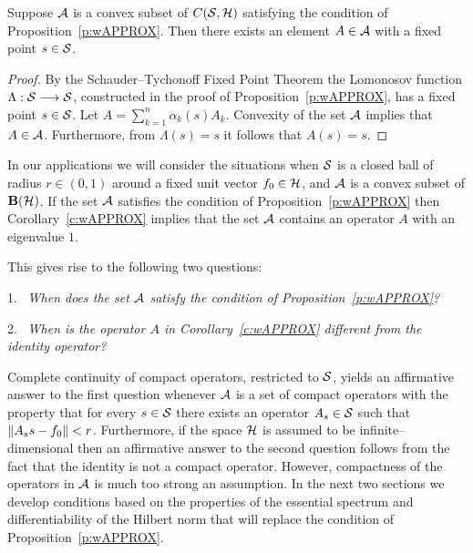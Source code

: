\medskip

\goodbreak

\begin{cor} \label{c:wAPPROX}
Suppose ${\cal A}$ is a convex subset of $C({\cal S},{\cal H})$ satisfying the
condition of Proposition~\ref{p:wAPPROX}. Then there exists an
element $A\in{\cal A}$ with a fixed point $s\in{\cal S}$.
\end{cor}

\begin{proof}
By the Schauder--Tychonoff Fixed Point Theorem the Lomonosov
function $\Lambda:{\cal S}\longrightarrow{\cal S}$, constructed in the proof of
Proposition~\ref{p:wAPPROX}, has a fixed point $s\in{\cal S}$. Let
$A=\sum_{k=1}^n\alpha_k(s)A_k$. Convexity of the set ${\cal A}$
implies that $A\in{\cal A}$. Furthermore, from $\Lambda(s)=s$ it
follows that $A(s)=s$.
\end{proof}

\begin{rem}
In our applications we will consider the situations when ${\cal S}$
is a closed ball of radius $r\in(0,1)$ around a fixed unit
vector $f_0\in{\cal H}$, and ${\cal A}$ is a convex subset of $\mathbf B(\cal H)$. If the
set ${\cal A}$ satisfies the condition of Proposition~\ref{p:wAPPROX}
then Corollary~\ref{c:wAPPROX} implies that the set ${\cal A}$
contains an operator $A$ with an eigenvalue $1$.

\medskip

This gives rise to the following two questions:

\smallskip

1.~ {\em When does the set ${\cal A}$ satisfy the condition of
Proposition~\ref{p:wAPPROX}?}

2.~ {\em When is the operator $A$ in Corollary~\ref{c:wAPPROX}
different from the identity operator? }

\smallskip

Complete continuity of compact operators, restricted to ${\cal S}$,
yields an affirmative answer to the first question whenever
${\cal A}$ is a set of compact operators with the property that for
every $s\in{\cal S}$ there exists an operator $A_s\in{\cal S}$ such that
$\left\Vert A_s s - f_0\right\Vert<r$. Furthermore, if the space ${\cal H}$ is
assumed to be infinite--dimensional then an affirmative answer
to the second question follows from the fact that the identity
is not a compact operator. However, compactness of the
operators in ${\cal A}$ is much too strong an assumption. In the next
two sections we develop conditions based on the properties of
the essential spectrum and differentiability of the Hilbert
norm that will replace the condition of
Proposition~\ref{p:wAPPROX}.
\end{rem}

